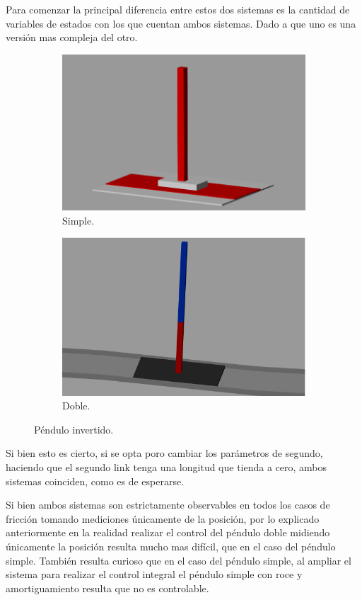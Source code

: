 Para comenzar la principal diferencia entre estos dos sistemas es la cantidad de variables de estados con los que cuentan ambos sistemas.
Dado a que uno es una versión mas compleja del otro.
\begin{figure}[H]
\begin{subfigure}{.5\textwidth}
  \centering
  \includegraphics[width=0.95\linewidth]{../Analisis de Resultados/ImagenesAnalisis de Resultados/equilibrio.png}
  \caption{Simple.}
  \label{fig:sfig1}
\end{subfigure}%
\begin{subfigure}{.5\textwidth}
  \centering
  \includegraphics[width=0.95\linewidth]{../Analisis de Resultados/ImagenesAnalisis de Resultados/simscape_double_pendulum.png}
  \caption{Doble.}
  \label{fig:sfig2}
\end{subfigure}
\caption{Péndulo invertido.}
\label{fig:fig}
\end{figure}
Si bien esto es cierto, si se opta poro cambiar los parámetros de segundo, haciendo que el segundo link tenga una longitud que tienda a cero, ambos sistemas coinciden, como es de esperarse.

Si bien ambos sistemas son estrictamente observables en todos los casos de fricción tomando mediciones únicamente de la posición, por lo explicado anteriormente en la realidad realizar el control del péndulo doble midiendo únicamente la posición resulta mucho mas difícil, que en el caso del péndulo simple.
También resulta curioso que en el caso del péndulo simple, al ampliar el sistema para realizar el control integral el péndulo simple con roce y amortiguamiento resulta que no es controlable.
%